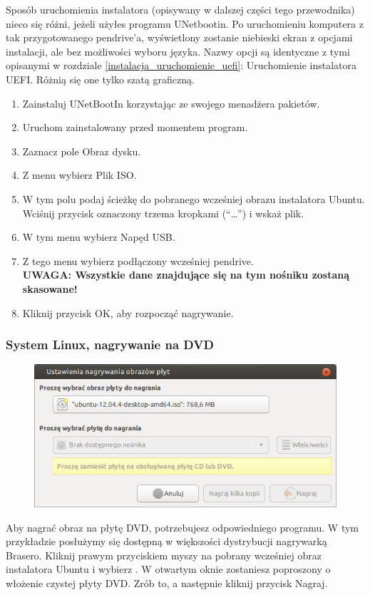 Sposób uruchomienia instalatora (opisywany w dalszej części tego przewodnika) nieco się różni, jeżeli użyłes programu UNetbootin. Po uruchomieniu komputera z tak przygotowanego pendrive'a, wyświetlony zostanie niebieski ekran z opcjami instalacji, ale bez możliwości wyboru języka. Nazwy opcji są identyczne z tymi opisanymi w rozdziale \ref{instalacja_uruchomienie_uefi}: Uruchomienie instalatora UEFI. Różnią się one tylko szatą graficzną.
\begin{enumerate}[label=\protect\circled{\arabic*}]
\item Zainstaluj UNetBootIn korzystając ze swojego menadżera pakietów.
\item Uruchom zainstalowany przed momentem program.
\item Zaznacz pole Obraz dysku.
\item Z menu wybierz Plik ISO.
\item W tym polu podaj ścieżkę do pobranego wcześniej obrazu instalatora Ubuntu. Wciśnij przycisk oznaczony trzema kropkami (“\ldots”) i wskaż plik.
\item W tym menu wybierz Napęd USB.
\item Z tego menu wybierz podłączony wcześniej pendrive.\\
\textbf{UWAGA: Wszystkie dane znajdujące się na tym nośniku zostaną skasowane!}
\item Kliknij przycisk \textcolor{ubuntu_orange}{OK}, aby rozpocząć nagrywanie.
\end{enumerate}

\subsubsection{System Linux, nagrywanie na DVD}
\begin{figure}
	\vspace{-10pt}
	\includegraphics[width=\linewidth]{images/instalacja_nagrywanie_obrazu_linux_DVD.png}
\end{figure}

Aby nagrać obraz na płytę DVD, potrzebujesz odpowiedniego programu. W tym przykładzie posłużymy się dostępną w większości dystrybucji nagrywarką Brasero. Kliknij prawym przyciskiem myszy na pobrany wcześniej obraz instalatora Ubuntu i wybierz
. W otwartym oknie zostaniesz poproszony o włożenie czystej płyty DVD. Zrób to, a następnie kliknij przycisk \textcolor{ubuntu_orange}{Nagraj}.
